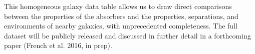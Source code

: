 \documentclass[iop]{emulateapj-rtx4}
\begin{document}
This homogeneous galaxy data table allows us to draw direct comparisons between the properties of the absorbers and the properties, separations, and environments of nearby galaxies, with unprecedented completeness. The full dataset will be publicly released and discussed in further detail in a forthcoming paper (French et al. 2016, in prep).


\begin{figure}[h!]
\centering

\end{figure}
\end{document}

